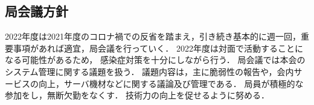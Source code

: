\subsection*{局会議方針}

2022年度は2021年度のコロナ禍での反省を踏まえ，引き続き基本的に週一回，重要事項があれば適宜，局会議を行っていく．
2022年度は対面で活動することになる可能性があるため， 感染症対策を十分にしながら行う．
局会議では本会のシステム管理に関する議題を扱う．
議題内容は，主に脆弱性の報告や，会内サービスの向上，サーバ機材などに関する議論及び管理である．
局員が積極的な参加をし，無断欠勤をなくす．
技術力の向上を促せるように努める．
